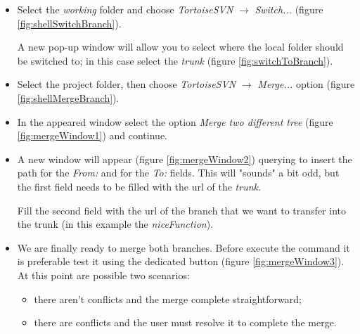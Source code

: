 \begin{itemize}

    \item  Select the \textit{working} folder and choose \textit{TortoiseSVN} $\rightarrow$ \textit{Switch...} (figure \ref{fig:shellSwitchBranch}).
    
    A new pop-up window will allow you to select where the local folder should be switched to; in this case select the \textit{trunk} (figure \ref{fig:switchToBranch}). 

	
    \item Select the project folder, then choose \textit{TortoiseSVN} $\rightarrow$ \textit{Merge...} option (figure \ref{fig:shellMergeBranch}).
    
	
    \item In the appeared window select the option \textit{Merge two different tree} (figure \ref{fig:mergeWindow1}) and continue.
	
	
	\item A new window will appear (figure \ref{fig:mergeWindow2}) querying to insert the path for the \textit{From:} and for the \textit{To:} fields. This will "sounds" a bit odd, but the first field needs to be filled with the url of the \textit{trunk}.
	
	Fill the second field with the url of the branch that we want to transfer into the trunk (in this example the \textit{niceFunction}).
	
    
    \item We are finally ready to merge both branches. Before execute the command it is preferable test it using the dedicated button (figure \ref{fig:mergeWindow3}). At this point are possible two scenarios:
    
    \begin{itemize}
    
    \item there aren't conflicts and the merge complete straightforward;
    
    \item there are conflicts and the user must resolve it to complete the merge.
    
    \end{itemize}

\end{itemize}





